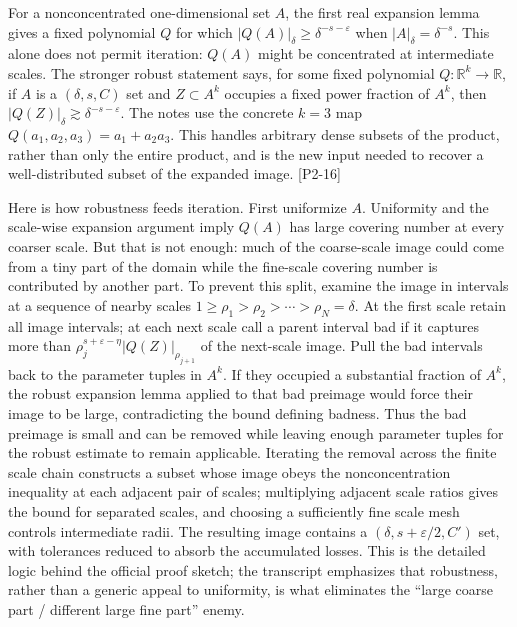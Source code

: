 \hypertarget{04-visual-computing-ii-ch033-robust-expansion-is-what-makes-the-real-argument-iterate}{}

For a nonconcentrated one-dimensional set \(A\), the first real expansion lemma gives a fixed polynomial \(Q\) for which \(|Q(A)|_\delta\ge\delta^{-s-\varepsilon}\) when \(|A|_\delta=\delta^{-s}\). This alone does not permit iteration: \(Q(A)\) might be concentrated at intermediate scales. The stronger robust statement says, for some fixed polynomial \(Q:\mathbb R^k\to\mathbb R\), if \(A\) is a \((\delta,s,C)\) set and \(Z\subset A^k\) occupies a fixed power fraction of \(A^k\), then \(|Q(Z)|_\delta\gtrsim\delta^{-s-\varepsilon}\). The notes use the concrete \(k=3\) map \(Q(a_1,a_2,a_3)=a_1+a_2a_3\). This handles arbitrary dense subsets of the product, rather than only the entire product, and is the new input needed to recover a well-distributed subset of the expanded image. {[}P2-16{]}

Here is how robustness feeds iteration. First uniformize \(A\). Uniformity and the scale-wise expansion argument imply \(Q(A)\) has large covering number at every coarser scale. But that is not enough: much of the coarse-scale image could come from a tiny part of the domain while the fine-scale covering number is contributed by another part. To prevent this split, examine the image in intervals at a sequence of nearby scales \(1\ge\rho_1>\rho_2>\cdots>\rho_N=\delta\). At the first scale retain all image intervals; at each next scale call a parent interval bad if it captures more than \(\rho_j^{s+\varepsilon-\eta}|Q(Z)|_{\rho_{j+1}}\) of the next-scale image. Pull the bad intervals back to the parameter tuples in \(A^k\). If they occupied a substantial fraction of \(A^k\), the robust expansion lemma applied to that bad preimage would force their image to be large, contradicting the bound defining badness. Thus the bad preimage is small and can be removed while leaving enough parameter tuples for the robust estimate to remain applicable. Iterating the removal across the finite scale chain constructs a subset whose image obeys the nonconcentration inequality at each adjacent pair of scales; multiplying adjacent scale ratios gives the bound for separated scales, and choosing a sufficiently fine scale mesh controls intermediate radii. The resulting image contains a \((\delta,s+\varepsilon/2,C')\) set, with tolerances reduced to absorb the accumulated losses. This is the detailed logic behind the official proof sketch; the transcript emphasizes that robustness, rather than a generic appeal to uniformity, is what eliminates the ``large coarse part / different large fine part'' enemy.

